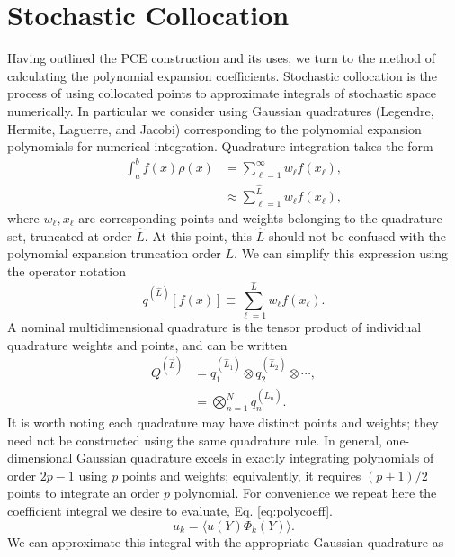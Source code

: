 \section{Stochastic Collocation}\label{sec:stoch coll}
Having outlined the PCE construction and its uses, we turn to the method of calculating the polynomial
expansion coefficients.  Stochastic collocation is the process of using collocated points to approximate integrals 
of stochastic space
numerically.  In particular we consider using Gaussian quadratures (Legendre, Hermite, Laguerre, and Jacobi)
corresponding to the polynomial expansion polynomials for numerical integration.  Quadrature integration takes
the form
\begin{align}
  \int_a^b f(x)\rho(x) &= \sum_{\ell=1}^\infty w_\ell f(x_\ell),\\
  &\approx \sum_{\ell=1}^{\hat L} w_\ell f(x_\ell),
\end{align}
where $w_\ell,x_\ell$ are corresponding points and weights belonging to the quadrature set, truncated at order
$\hat L$.  At this point, this $\hat L$ should not be confused with the polynomial expansion truncation order $L$.  We
can simplify this expression using the operator notation
\begin{equation}\label{eq:quad op}
  q^{(\hat L)}[f(x)] \equiv \sum_{\ell=1}^{\hat L} w_\ell f(x_\ell).
\end{equation}
A nominal multidimensional quadrature is the tensor product of
individual quadrature weights and points, and can be written
\begin{align}
  Q^{(\vec{L})} &= q^{(\hat L_1)}_1 \otimes q^{(\hat L_2)}_2 \otimes \cdots,\\
                     &= \bigotimes_{n=1}^N q^{(\hat L_n)}_n.
\end{align}
It is worth noting each quadrature may have distinct points and weights; they need not be constructed using
the same quadrature rule.
In general, one-dimensional Gaussian
quadrature excels in exactly integrating polynomials of order $2p-1$ using $p$ points and weights;
equivalently, it requires $(p+1)/2$ points to integrate an order $p$ polynomial. 
For convenience we repeat here the coefficient integral we desire to evaluate, Eq.
\ref{eq:polycoeff}.
\begin{equation}
  u_k = \langle u(Y)\Phi_k(Y) \rangle.
\end{equation}
We can approximate this integral with the appropriate Gaussian quadrature as
